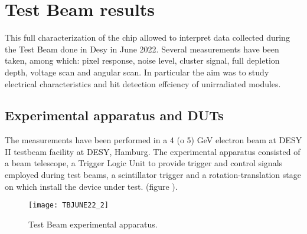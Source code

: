 






\section{Test Beam results}

This full characterization of the chip allowed to interpret data collected during the Test Beam done in Desy in June 2022. Several measurements have been taken, among which: pixel response, noise level, cluster signal, full depletion depth, voltage scan and angular scan. In particular the aim was to study electrical characteristics and hit detection effciency of unirradiated modules.



\subsection{Experimental apparatus and DUTs }

The measurements have been performed in a 4 (o 5) GeV electron beam at DESY II testbeam facility at DESY, Hamburg. The experimental apparatus consisted of a beam telescope, a Trigger Logic Unit to provide trigger and control signals employed during test beams, a scintillator trigger and a rotation-translation stage on which install the device under test. (figure ).

\begin{figure}[h!]
\centering
\texttt{[image: TBJUNE22\_2]}
\caption{Test Beam experimental apparatus.}
\label{fig:tb}
\end{figure}



\begin{comment}
\begin{figure}[h!]
\centering
\subfigure[Test beam apparatus.]
{\texttt{[image: TBJUNE22\_PHOTO]}}\quad
\subfigure[Test beam schematics.]
{\texttt{[image: TBJUNE22]}}\\
\caption{Test Beam setting at DESY.}
\label{fig:tb}
\end{figure}
\end{comment}

